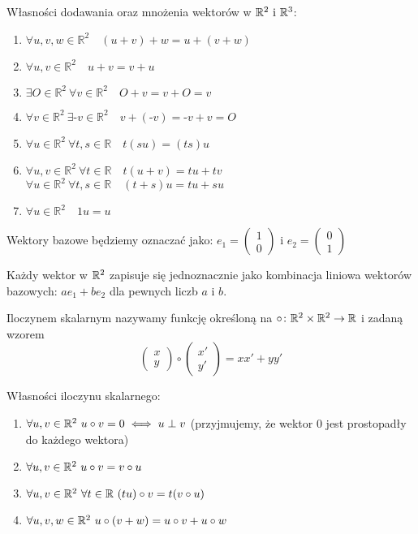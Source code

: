 Własności dodawania oraz mnożenia wektorów w $\mathbb{R}^2 \text{ i } \mathbb{R}^3$:
\begin{enumerate}[{(}1{)}]
    \item $\forall u, v, w \in \mathbb{R}^2 \quad (u+v)+w = u+(v+w) $
    \item $\forall u, v \in \mathbb{R}^2 \quad u+v = v+u$
    \item $\exists O \in \mathbb{R}^2 \  \forall v \in \mathbb{R}^2 \quad O+v = v+O = v$
    \item $\forall v \in \mathbb{R}^2 \ \exists \text{-} v \in \mathbb{R}^2 \quad v+( \text{-}v) = \text{-} v+v = O$
    \item $\forall u \in \mathbb{R}^2 \ \forall t,s \in \mathbb{R} \quad t(su) = (ts)u$
    \item $\forall u,v \in \mathbb{R}^2 \ \forall t \in \mathbb{R} \quad t(u+v) = tu + tv$ \\ 
          $\forall u \in \mathbb{R}^2 \ \forall t,s  \in
          \mathbb{R} \quad (t+s)u = tu + su$
    \item $\forall u \in \mathbb{R}^2 \quad 1u = u$
\end{enumerate}
    
\begin{ozn} Wektory bazowe będziemy oznaczać jako:
    $e_1 = \begin{pmatrix} 1 \\ 0 \end{pmatrix}$ i $e_2 = \begin{pmatrix} 0 \\ 1\end{pmatrix}$ \end{ozn}
\begin{ft} Każdy wektor w $\mathbb{R}^2$ zapisuje się jednoznacznie jako kombinacja liniowa wektorów bazowych: $a e_1 + b e_2$ dla pewnych liczb $a$ i $b.$ \end{ft}
    
\begin{df}[algebraiczna]
Iloczynem skalarnym nazywamy funkcję określoną na $\circ\colon\mathbb{R}^2\times\mathbb{R}^2\to\mathbb{R}$ i zadaną wzorem 
\[ \begin{pmatrix} x \\ y\end{pmatrix} \circ \begin{pmatrix} x' \\ y' \end{pmatrix} = xx' + yy' \]
\end{df}
    
Własności iloczynu skalarnego:
\begin{enumerate}[{(}1{)}]
    \item $ \forall u, v \in \mathbb{R}^2 \ u \circ v = 0 \iff u \perp v$ (przyjmujemy, że wektor $0$ jest prostopadły do każdego wektora)
    \item $ \forall u, v \in \mathbb{R}^2 \ u \circ v = v \circ u$
    \item $ \forall u, v \in \mathbb{R}^2 \ \forall t \in \mathbb{R} \ (tu) \circ v =  t(v \circ u)$
    \item $ \forall u, v, w \in \mathbb{R}^2 \ u \circ (v + w) = u \circ v + u \circ w$
\end{enumerate}
    

